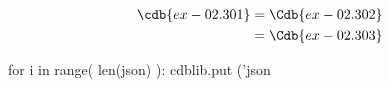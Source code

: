 \documentclass[12pt]{cdblatex}
\begin{document}
\begin{align}
   \cdb{ex-02.301} &= \Cdb{ex-02.302}\\
                   &= \Cdb{ex-02.303}
\end{align}

\clearpage


\bgroup
{}
\begin{cadabra}
   for i in range( len(json) ):
      cdblib.put ('json%
\end{cadabra}
\egroup
\end{document}
